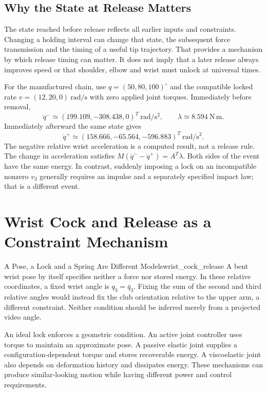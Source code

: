\subsection{Why the State at Release Matters}
\label{inplain:sequential_unlocking_why}
\label{laymans:inplain:sequential_unlocking_why}
The state reached before release reflects all earlier inputs and constraints. Changing a holding interval can change that state, the subsequent force transmission and the timing of a useful tip trajectory. That provides a mechanism by which release timing can matter. It does not imply that a later release always improves speed or that shoulder, elbow and wrist must unlock at universal times.

For the manufactured chain, use $q=(50,80,100)^\circ$ and the compatible locked rate $v=(12,20,0)\ \mathrm{rad/s}$ with zero applied joint torques. Immediately before removal,
\[
\ddot q^-\simeq(199.109,-308.438,0)^T\ \mathrm{rad/s^2},\qquad
\lambda\simeq8.594\ \mathrm{N\,m}.
\]
Immediately afterward the same state gives
\[
\ddot q^+\simeq(158.666,-65.564,-596.883)^T\ \mathrm{rad/s^2}.
\]
The negative relative wrist acceleration is a computed result, not a release rule. The change in acceleration satisfies $M(\ddot q^- -\ddot q^+)=A^T\lambda$. Both sides of the event have the same energy. In contrast, suddenly imposing a lock on an incompatible nonzero $v_3$ generally requires an impulse and a separately specified impact law; that is a different event.

\section{Wrist Cock and Release as a Constraint Mechanism}
\label{sec:wrist_cock_release}
\label{ex:wrist_cock_timing}
\begin{definition}{A Pose, a Lock and a Spring Are Different Models}{wrist_cock_release}
A bent wrist pose by itself specifies neither a force nor stored energy. In these relative coordinates, a fixed wrist angle is $q_3=\bar q_3$. Fixing the sum of the second and third relative angles would instead fix the club orientation relative to the upper arm, a different constraint. Neither condition should be inferred merely from a projected video angle.

An ideal lock enforces a geometric condition. An active joint controller uses torque to maintain an approximate pose. A passive elastic joint supplies a configuration-dependent torque and stores recoverable energy. A viscoelastic joint also depends on deformation history and dissipates energy. These mechanisms can produce similar-looking motion while having different power and control requirements.
\end{definition}

